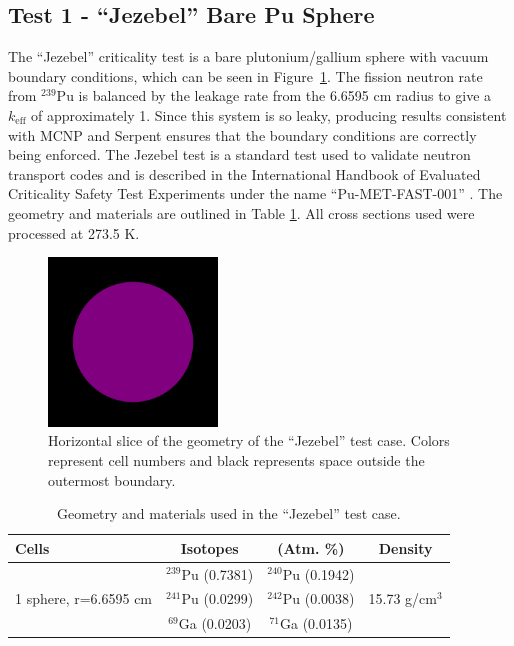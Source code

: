 \documentclass[preprint,12pt]{elsarticle}
\begin{document}
\newpage
\subsection{Test 1 - ``Jezebel'' Bare Pu Sphere}

The ``Jezebel'' criticality test is a bare plutonium/gallium sphere with vacuum boundary conditions, which can be seen in Figure~\ref{jezebel_geom_pic}.  The fission neutron rate from $^{239}$Pu is balanced by the leakage rate from the 6.6595 cm radius to give a $k_\mathrm{eff}$ of approximately 1.  Since this system is so leaky, producing results consistent with MCNP and Serpent ensures that the boundary conditions are correctly being enforced.  The Jezebel test is a standard test used to validate neutron transport codes and is described in the International Handbook of Evaluated Criticality Safety Test Experiments under the name ``Pu-MET-FAST-001'' \cite{bench_handbook}.  The geometry and materials are outlined in Table \ref{jezebel_geom}.  All cross sections used were processed at 273.5 K.

\begin{figure}[h!] 
  \centering
    \includegraphics[width=0.4\textwidth]{graphics/jezebel-xy.png}
     \caption{ Horizontal slice of the geometry of the ``Jezebel'' test case.  Colors represent cell numbers and black represents space outside the outermost boundary. \label{jezebel_geom_pic} }
\end{figure}

\begin{table}[h]
\centering
\caption{Geometry and materials used in the ``Jezebel'' test case.}
\label{jezebel_geom}
\begin{tabular}{| l | c  c | c |}
\hline
Cells & Isotopes & (Atm. \%)& Density \\
\hline
\multirow{3}{*}{1 sphere, r=6.6595 cm }  &  $^{239}$Pu (0.7381)    &    $^{240}$Pu (0.1942)     &  \multirow{3}{*}{15.73 g/cm$^3$} \\
                                         &  $^{241}$Pu (0.0299)    &     $^{242}$Pu (0.0038)    &   \\
                                         &  $^{69}$Ga  (0.0203)    &     $^{71}$Ga  (0.0135)    &   \\
\hline
\end{tabular}
\end{table}
\end{document}
